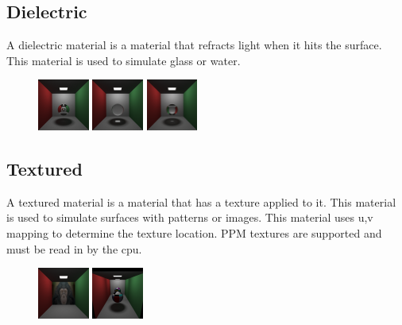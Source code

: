 \documentclass{article}
\begin{document}
    \subsection{Dielectric}
    A dielectric material is a material that refracts light when it hits the surface. This material is used to simulate glass or water. \par
    \begin{figure}[h!]
        \centering
        \includegraphics[width=0.15\textwidth]{samples/Dielectric0p3.png}
        \includegraphics[width=0.15\textwidth]{samples/Dielectric1p5.png}
        \includegraphics[width=0.15\textwidth]{samples/Dielectric5.png}
    \end{figure}


    \subsection{Textured}
    A textured material is a material that has a texture applied to it. This material is used to simulate surfaces with patterns or images. This material uses u,v mapping to determine the texture location. PPM textures are supported and must be read in by the cpu. \par
    \begin{figure}[h!]
        \centering
        \includegraphics[width=0.15\textwidth]{samples/TexturedMonky.png}
        \includegraphics[width=0.15\textwidth]{samples/TexturedWMirror.png}
    \end{figure}
\end{document}
